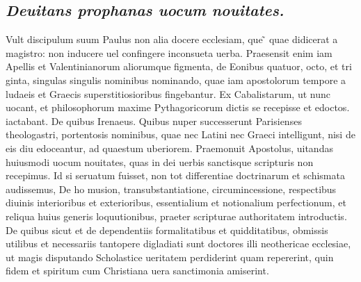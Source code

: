 \documentclass{article}
\begin{document}
\begin{pages}
\subsection*{\textit{Deuitans prophanas uocum nouitates. }}\pstart Vult discipulum suum Paulus non alia docere ecclesiam, que ̃ quae didicerat a magistro: non inducere uel confingere inconsueta uerba. Praesensit enim iam Apellis et Valentinianorum aliorumque figmenta, de Eonibus quatuor, octo, et tri ginta, singulas singulis nominibus nominando, quae iam apostolorum tempore a ludaeis et Graecis superstitiosioribus fingebantur. Ex Cabalistarum, ut nunc uocant, et philosophorum maxime Pythagoricorum dictis se recepisse et edoctos. iactabant. De quibus Irenaeus. Quibus nuper successerunt Parisienses theologastri, portentosis nominibus, quae nec Latini nec Graeci intelligunt, nisi de eis diu edoceantur, ad quaestum uberiorem. Praemonuit Apostolus, uitandas huiusmodi uocum nouitates, quas in dei uerbis sanctisque scripturis non recepimus. Id si seruatum fuisset, non tot differentiae doctrinarum et schismata audissemus, De ho musion, transubstantiatione, circumincessione, respectibus diuinis interioribus et exterioribus, essentialium et notionalium perfectionum, et reliqua huius generis loquutionibus, praeter scripturae authoritatem introductis. De quibus sicut et de dependentiis formalitatibus et quidditatibus, obmissis utilibus et necessariis tantopere digladiati sunt doctores illi neothericae ecclesiae, ut magis disputando Scholastice ueritatem perdiderint quam repererint, quin fidem et spiritum cum Christiana uera sanctimonia amiserint.  \pend
{}
{}

\end{pages}
\end{document}
